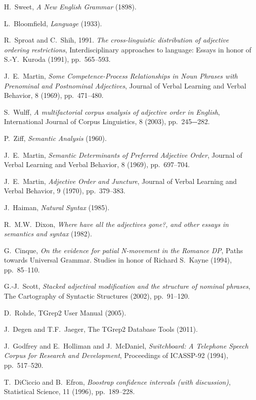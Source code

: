 \documentclass{pnastwo}
\begin{document}
\begin{article}
\begin{thebibliography}{10}
	H.~Sweet, {\em A New English Grammar} (1898).
	
	L.~Bloomfield, {\em Language} (1933).
	
	R.~Sproat and C.~Shih, 1991. {\em The cross-linguistic distribution of adjective ordering restrictions}, Interdisciplinary approaches to language: Essays in honor of S.-Y.~Kuroda (1991), pp.~565--593.
	
	J.~E.~Martin, {\em Some Competence-Process Relationships in Noun Phrases with Prenominal and Postnominal Adjectives}, Journal of Verbal Learning and Verbal Behavior, 8 (1969), pp.~471--480. 	
	
	S.~Wulff, {\em A multifactorial corpus analysis of adjective order in English},
	International Journal of Corpus Linguistics, 8 (2003), pp.~245‒-282.
	
	P.~Ziff, {\em Semantic Analysis} (1960).
	
	J.~E.~Martin, {\em Semantic Determinants of Preferred Adjective Order}, Journal of Verbal Learning and Verbal Behavior, 8 (1969), pp.~697--704. 
	
	J.~E.~Martin, {\em Adjective Order and Juncture}, Journal of Verbal Learning and Verbal Behavior, 9 (1970), pp.~379--383. 
	
	J.~Haiman, {\em Natural Syntax} (1985).
	
	R.~M.W.~Dixon, {\em Where have all the adjectives gone?, and other essays in semantics and syntax} (1982).
	
	G.~Cinque, {\em On the evidence for patial N-movement in the Romance DP}, Paths towards Universal Grammar. Studies in honor of Richard S.~Kayne (1994), pp.~85--110.
	
	G.-J.~Scott, {\em Stacked adjectival modification and the structure of nominal phrases}, The Cartography of Syntactic Structures (2002), pp.~91--120.
	
	D.~Rohde, TGrep2 User Manual (2005).
	
	J.~Degen and T.F.~Jaeger, The TGrep2 Database Tools (2011).
	
	J.~Godfrey and E.~Holliman and J.~McDaniel, {\em Switchboard: A Telephone Speech Corpus for Research and Development}, Proceedings of ICASSP-92 (1994),
	pp.~517--520.
	
	T.~DiCiccio and B.~Efron, {\em Boostrap confidence intervals (with discussion)}, Statistical Science, 11 (1996), pp.~189--228.
\end{thebibliography}


\end{article}
\end{document}
